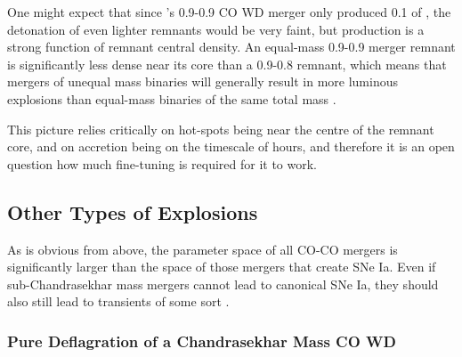 One might expect that since \citeauthor{pakm+10}'s 0.9-0.9 CO WD merger only produced 0.1 {\Msun} of {\Ni}, the detonation of even lighter remnants would be very faint, but {\Ni} production is a strong function of remnant central density.  An equal-mass 0.9-0.9 {\Msun} merger remnant is significantly less dense near its core than a 0.9-0.8 remnant, which means that mergers of unequal mass binaries will generally result in more luminous explosions than equal-mass binaries of the same total mass \citep{pakm+11,vkercj10}.

This picture relies critically on hot-spots being near the centre of the remnant core, and on accretion being on the timescale of hours, and therefore it is an open question how much fine-tuning is required for it to work.

\subsection{Other Types of Explosions}

As is obvious from above, the parameter space of all CO-CO mergers is significantly larger than the space of those mergers that create SNe Ia.  Even if sub-Chandrasekhar mass mergers cannot lead to canonical SNe Ia, they should also still lead to transients of some sort \citep{pakm+10}.

\subsubsection{Pure Deflagration of a Chandrasekhar Mass CO WD}


